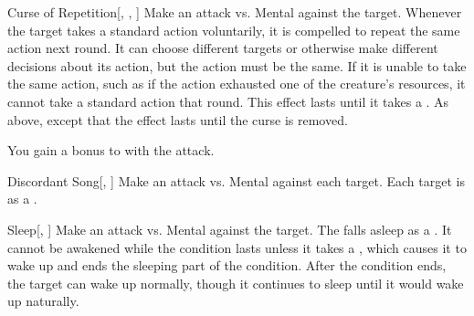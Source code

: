 \lowercase{\hypertarget{spell:Curse of Repetition}{}}\label{spell:Curse of Repetition}
\begin{freeability}[Rank 6]{\hypertarget{spell:Curse of Repetition}{Curse of Repetition}}[, , ]
Make an attack vs. Mental against the target.
\hit Whenever the target takes a standard action voluntarily, it is compelled to repeat the same action next round.
It can choose different targets or otherwise make different decisions about its action, but the action must be the same.
If it is unable to take the same action, such as if the action exhausted one of the creature's resources, it cannot take a standard action that round.
This effect lasts until it takes a .
\crit As above, except that the effect lasts until the curse is removed.

\rankline
{} You gain a  bonus to  with the attack.
\end{freeability}
\vspace{0.25em}



\lowercase{\hypertarget{spell:Discordant Song}{}}\label{spell:Discordant Song}
\begin{freeability}[Rank 7]{\hypertarget{spell:Discordant Song}{Discordant Song}}[, ]
Make an attack vs. Mental against each target.
\hit Each target is \disoriented as a .
\end{freeability}
\vspace{0.25em}



\lowercase{\hypertarget{spell:Sleep}{}}\label{spell:Sleep}
\begin{freeability}[Rank 8]{\hypertarget{spell:Sleep}{Sleep}}[, ]
Make an attack vs. Mental against the target.
\hit The falls asleep as a .
It cannot be awakened while the condition lasts unless it takes a , which causes it to wake up and ends the sleeping part of the condition.
After the condition ends, the target can wake up normally, though it continues to sleep until it would wake up naturally.
\end{freeability}
\vspace{0.25em}



